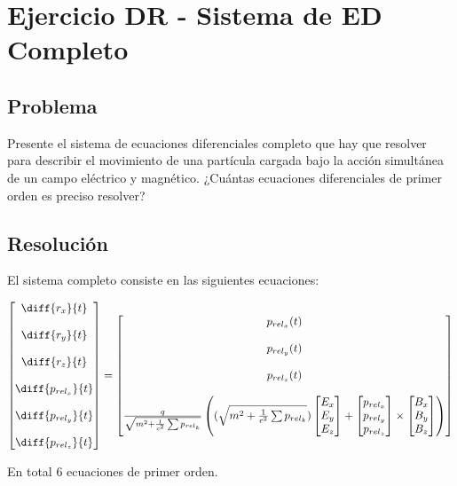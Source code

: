 \section{Ejercicio DR - Sistema de ED Completo}

\subsection{Problema}
Presente el sistema de ecuaciones diferenciales completo que hay que resolver para describir el movimiento de una partícula cargada bajo la acción simultánea de un campo eléctrico y magnético. ¿Cuántas ecuaciones diferenciales de primer orden es preciso resolver?

\subsection{Resolución}

El sistema completo consiste en las siguientes ecuaciones:

\begin{equation*} 
	\begin{bmatrix} 
	\diff{r_x}{t} \\ \\
	\diff{r_y}{t} \\ \\ 
	\diff{r_z}{t} \\ \\
	\diff{p_{rel_x}}{t} \\ \\
	\diff{p_{rel_y}}{t} \\ \\ 
	\diff{p_{rel_z}}{t} 
\end{bmatrix} = 
\begin{bmatrix}
	p_{rel_x}(t) \\ \\ p_{rel_y}(t) \\ \\ p_{rel_z}(t)
\\ \\
		\frac{q}{\sqrt{ 
			m^2 + \frac{1}{c^2} \sum p_{rel_k}	
	}} \left( 
	(\sqrt{ 
		m^2 + \frac{1}{c^2} \sum p_{rel_k}	
	})\begin{bmatrix} 
		E_x \\ E_y \\ E_z 
	\end{bmatrix} + 
	\begin{bmatrix} 
		p_{rel_x} \\ p_{rel_y} \\ p_{rel_z}
	\end{bmatrix} 
	\times 
	\begin{bmatrix} B_x \\ B_y \\ B_z \end{bmatrix} 
	\right)
\end{bmatrix} 
\end{equation*}

En total 6 ecuaciones de primer orden.